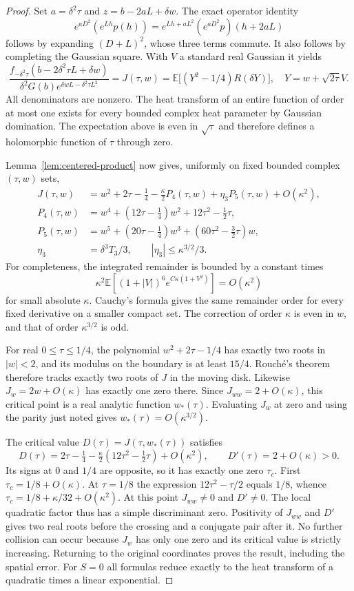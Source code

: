 \begin{proof}
Set $a=\delta^2\tau$ and $z=b-2aL+\delta w$. The exact operator identity
\[
 e^{aD^2}(e^{Lh}p(h))
   =e^{Lh+aL^2}(e^{aD^2}p)(h+2aL)
\]
follows by expanding $(D+L)^2$, whose three terms commute. It also follows by completing the Gaussian square. With $V$ a standard real Gaussian it yields
\[
 \frac{f_{-\delta^2\tau}(b-2\delta^2\tau L+\delta w)}
 {\delta^2G(b)e^{\delta wL-\delta^2\tau L^2}}
 =J(\tau,w)
 =\mathbb E\bigl[(Y^2-1/4)R(\delta Y)\bigr],
 \quad Y=w+\sqrt{2\tau}V.
\]
All denominators are nonzero. The heat transform of an entire function of order at most one exists for every bounded complex heat parameter by Gaussian domination. The expectation above is even in $\sqrt\tau$ and therefore defines a holomorphic function of $\tau$ through zero.

Lemma~\ref{lem:centered-product} now gives, uniformly on fixed bounded complex $(\tau,w)$ sets,
\begin{align*}
 J(\tau,w)&=w^2+2\tau-\tfrac14-\tfrac\kappa2P_4(\tau,w)
             +\eta_3P_5(\tau,w)+O(\kappa^2),\\
 P_4(\tau,w)&=w^4+(12\tau-\tfrac14)w^2+12\tau^2-\tfrac12\tau,\\
 P_5(\tau,w)&=w^5+(20\tau-\tfrac14)w^3
                       +(60\tau^2-\tfrac32\tau)w,\\
 \eta_3&=\delta^3T_3/3,\qquad |\eta_3|\le\kappa^{3/2}/3.
\end{align*}
For completeness, the integrated remainder is bounded by a constant times
\[
 \kappa^2\mathbb E[(1+|V|)^6e^{C\kappa(1+V^2)}]=O(\kappa^2)
\]
for small absolute $\kappa$. Cauchy's formula gives the same remainder order for every fixed derivative on a smaller compact set. The correction of order $\kappa$ is even in $w$, and that of order $\kappa^{3/2}$ is odd.

For real $0\le\tau\le1/4$, the polynomial $w^2+2\tau-1/4$ has exactly two roots in $|w|<2$, and its modulus on the boundary is at least $15/4$. Rouch\'e's theorem therefore tracks exactly two roots of $J$ in the moving disk. Likewise $J_w=2w+O(\kappa)$ has exactly one zero there. Since $J_{ww}=2+O(\kappa)$, this critical point is a real analytic function $w_*(\tau)$. Evaluating $J_w$ at zero and using the parity just noted gives
$w_*(\tau)=O(\kappa^{3/2})$.

The critical value $D(\tau)=J(\tau,w_*(\tau))$ satisfies
\[
 D(\tau)=2\tau-\tfrac14
       -\tfrac\kappa2(12\tau^2-\tfrac12\tau)+O(\kappa^2),
 \qquad D'(\tau)=2+O(\kappa)>0.
\]
Its signs at $0$ and $1/4$ are opposite, so it has exactly one zero $\tau_c$. First $\tau_c=1/8+O(\kappa)$. At $\tau=1/8$ the expression $12\tau^2-\tau/2$ equals $1/8$, whence
$\tau_c=1/8+\kappa/32+O(\kappa^2)$.
At this point $J_{ww}\ne0$ and $D'\ne0$. The local quadratic factor thus has a simple discriminant zero. Positivity of $J_{ww}$ and $D'$ gives two real roots before the crossing and a conjugate pair after it. No further collision can occur because $J_w$ has only one zero and its critical value is strictly increasing. Returning to the original coordinates proves the result, including the spatial error. For $S=0$ all formulas reduce exactly to the heat transform of a quadratic times a linear exponential.
\end{proof}

